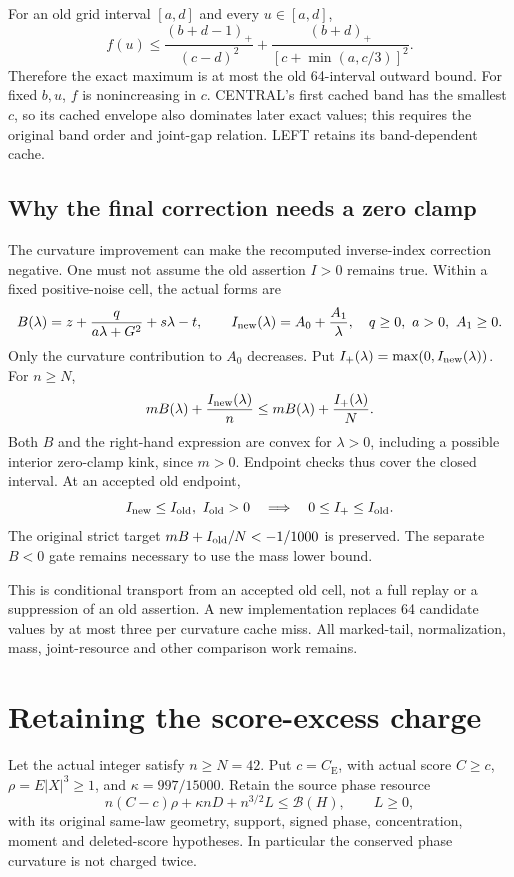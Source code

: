 \documentclass[11pt]{article}
\newcommand{\CE}{C_{\mathrm E}}
\newcommand{\pos}[1]{(#1)_+}
\begin{document}
For an old grid interval $[a,d]$ and every $u\in[a,d]$,
\[
 f(u)\le \frac{\pos{b+d-1}}{(c-d)^2}
       +\frac{\pos{b+d}}{[c+\min(a,c/3)]^2}.
\]
Therefore the exact maximum is at most the old 64-interval outward bound.
For fixed $b,u$, $f$ is nonincreasing in $c$. CENTRAL's first cached band
has the smallest $c$, so its cached envelope also dominates later exact
values; this requires the original band order and joint-gap relation.
LEFT retains its band-dependent cache.

\subsection{Why the final correction needs a zero clamp}
The curvature improvement can make the recomputed inverse-index correction
negative. One must not assume the old assertion $I>0$ remains true.
Within a fixed positive-noise cell, the actual forms are
\[
 B(\lambda)=z+\frac{q}{a\lambda+G^2}+s\lambda-t,\qquad
 I_{\rm new}(\lambda)=A_0+\frac{A_1}{\lambda},
 \quad q\ge0,\ a>0,\ A_1\ge0.
\]
Only the curvature contribution to $A_0$ decreases. Put
$I_+(\lambda)=\max(0,I_{\rm new}(\lambda))$. For $n\ge N$,
\[
 mB(\lambda)+\frac{I_{\rm new}(\lambda)}n
 \le mB(\lambda)+\frac{I_+(\lambda)}N.
\]
Both $B$ and the right-hand expression are convex for $\lambda>0$,
including a possible interior zero-clamp kink, since $m>0$.
Endpoint checks thus cover the closed interval. At an accepted old endpoint,
\[
 I_{\rm new}\le I_{\rm old},\ I_{\rm old}>0
 \quad\Longrightarrow\quad 0\le I_+\le I_{\rm old}.
\]
The original strict target $mB+I_{\rm old}/N<-1/1000$ is preserved.
The separate $B<0$ gate remains necessary to use the mass lower bound.

This is conditional transport from an accepted old cell, not a full replay
or a suppression of an old assertion. A new implementation replaces 64
candidate values by at most three per curvature cache miss. All marked-tail,
normalization, mass, joint-resource and other comparison work remains.

\section{Retaining the score-excess charge}
Let the actual integer satisfy $n\ge N=42$. Put $c=\CE$, with actual score $C\ge c$,
$\rho=E|X|^3\ge1$, and $\kappa=997/15000$. Retain the source phase resource
\begin{equation}\label{resource}
 n(C-c)\rho+\kappa nD+n^{3/2}L\le\mathcal B(H),\qquad L\ge0,
\end{equation}
with its original same-law geometry, support, signed phase, concentration,
moment and deleted-score hypotheses. In particular the conserved phase
curvature is not charged twice.
\end{document}
